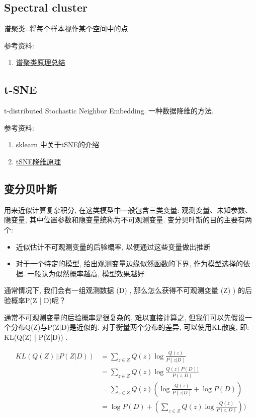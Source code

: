 \subsection{Spectral cluster}
谱聚类. 将每个样本视作某个空间中的点. 

参考资料: 
\begin{enumerate}
	\item \href{https://www.cnblogs.com/pinard/p/6221564.htm}{谱聚类原理总结}
\end{enumerate}

\subsection{t-SNE}
t-distributed Stochastic Neighbor Embedding. 一种数据降维的方法. 

参考资料: 
\begin{enumerate}
	\item \href{https://scikit-learn.org/stable/modules/manifold.html#t-distributed-stochastic-neighbor-embedding-t-sne}{sklearn 中关于tSNE的介绍}
	\item \href{https://www.jianshu.com/p/700f017cd330}{tSNE降维原理}
\end{enumerate}

\subsection{变分贝叶斯}
用来近似计算复杂积分, 在这类模型中一般包含三类变量: 观测变量、未知参数、隐变量, 其中位置参数和隐变量统称为不可观测变量. 变分贝叶斯的目的主要有两个: 
\begin{itemize}
	\item 近似估计不可观测变量的后验概率, 以便通过这些变量做出推断
	\item 对于一个特定的模型, 给出观测变量边缘似然函数的下界, 作为模型选择的依据. 一般认为似然概率越高, 模型效果越好
\end{itemize}
通常情况下, 我们会有一组观测数据 (D) , 那么怎么获得不可观测变量 (Z) ) 的后验概率P(Z | D)呢？

通常不可观测变量的后验概率是很复杂的, 难以直接计算之, 但我们可以先假设一个分布Q(Z)与P(Z|D)是近似的. 对于衡量两个分布的差异, 可以使用KL散度, 即: KL(Q(Z) | P(Z|D)) . 

$$
\begin{equation}\nonumber
	\begin{aligned}
		KL(Q(Z) || P(Z|D)) &= \sum_{z \in Z} Q(z) \log \frac{Q(z)}{P(z|D)} \\
		&= \sum_{z \in Z} Q(z) \log \frac{Q(z) P(D) )}{P(z, D) } \\	
		&= \sum_{z \in Z} Q(z) ( \log \frac{Q(z)}{P(z|D)} + \log P(D) ) \\
		&= \log P(D) + ( \sum_{z \in Z} Q(z) \log \frac{Q(z)}{P(z, D)}) ) 
	\end{aligned}
\end{equation}
$$


